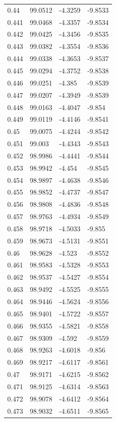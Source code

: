 \begin{tabular}{llll}
0.44 & 99.0512 & -4.3259 & -9.8533 \\
0.441 & 99.0468 & -4.3357 & -9.8534 \\
0.442 & 99.0425 & -4.3456 & -9.8535 \\
0.443 & 99.0382 & -4.3554 & -9.8536 \\
0.444 & 99.0338 & -4.3653 & -9.8537 \\
0.445 & 99.0294 & -4.3752 & -9.8538 \\
0.446 & 99.0251 & -4.385 & -9.8539 \\
0.447 & 99.0207 & -4.3949 & -9.8539 \\
0.448 & 99.0163 & -4.4047 & -9.854 \\
0.449 & 99.0119 & -4.4146 & -9.8541 \\
0.45 & 99.0075 & -4.4244 & -9.8542 \\
0.451 & 99.003 & -4.4343 & -9.8543 \\
0.452 & 98.9986 & -4.4441 & -9.8544 \\
0.453 & 98.9942 & -4.454 & -9.8545 \\
0.454 & 98.9897 & -4.4638 & -9.8546 \\
0.455 & 98.9852 & -4.4737 & -9.8547 \\
0.456 & 98.9808 & -4.4836 & -9.8548 \\
0.457 & 98.9763 & -4.4934 & -9.8549 \\
0.458 & 98.9718 & -4.5033 & -9.855 \\
0.459 & 98.9673 & -4.5131 & -9.8551 \\
0.46 & 98.9628 & -4.523 & -9.8552 \\
0.461 & 98.9583 & -4.5328 & -9.8553 \\
0.462 & 98.9537 & -4.5427 & -9.8554 \\
0.463 & 98.9492 & -4.5525 & -9.8555 \\
0.464 & 98.9446 & -4.5624 & -9.8556 \\
0.465 & 98.9401 & -4.5722 & -9.8557 \\
0.466 & 98.9355 & -4.5821 & -9.8558 \\
0.467 & 98.9309 & -4.592 & -9.8559 \\
0.468 & 98.9263 & -4.6018 & -9.856 \\
0.469 & 98.9217 & -4.6117 & -9.8561 \\
0.47 & 98.9171 & -4.6215 & -9.8562 \\
0.471 & 98.9125 & -4.6314 & -9.8563 \\
0.472 & 98.9078 & -4.6412 & -9.8564 \\
0.473 & 98.9032 & -4.6511 & -9.8565 \\

\end{tabular}
